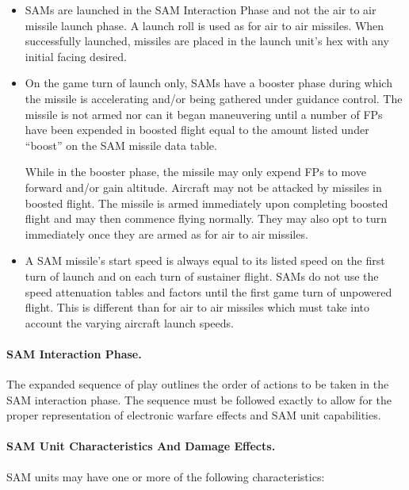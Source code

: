 \begin{itemize}

    \item{} SAMs are launched in the SAM Interaction Phase and not the air to air missile launch phase. A launch roll is used as for air to air missiles. When successfully launched, missiles are placed in the launch unit's hex with any initial facing desired.

    \item{} On the game turn of launch only, SAMs have a booster phase during which the missile is accelerating and/or being gathered under guidance control. The missile is not armed nor can it began maneuvering until a number of FPs have been expended in boosted flight equal to the amount listed under “boost” on the SAM missile data table.

    While in the booster phase, the missile may only expend FPs to move forward and/or gain altitude. Aircraft may not be attacked by missiles in boosted flight. The missile is armed immediately upon completing boosted flight and may then commence flying normally. They may also opt to turn immediately once they are armed as for air to air missiles.

    \item{} A SAM missile's start speed is always equal to its listed speed on the first turn of launch and on each turn of sustainer flight. SAMs do not use the speed attenuation tables and factors until the first game turn of unpowered flight. This is different than for air to air missiles which must take into account the varying aircraft launch speeds. 
    

\end{itemize}

\paragraph{SAM Interaction Phase.} The expanded sequence of play outlines the order of actions to be taken in the SAM interaction phase. The sequence must be followed exactly to allow for the proper representation of electronic warfare effects and SAM unit capabilities.

\paragraph{SAM Unit Characteristics And Damage Effects.} SAM units may have one or more of the following characteristics:

